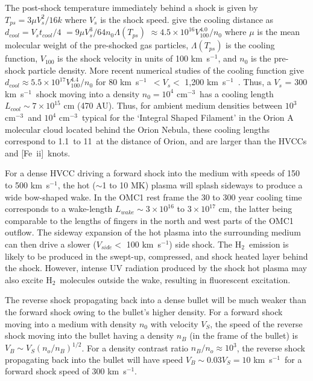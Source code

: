 \documentclass{aa}
\newcommand{\cmq}{cm{$^{-3}$}}
\newcommand{\kms}{km~s{$^{-1}$}}
\newcommand{\Feii}{[Fe~{\sc ii}]}
\newcommand{\hh}{\ensuremath{\textrm{H}_{2}}}			%
\begin{document}
The post-shock temperature immediately behind a  shock is  given by 
$T_{ps} = 3 \mu V_s^2/ 16 k$ where $V_s$  is the 
shock speed.   \citet{Blondin1990} give the cooling distance as
$d_{cool} = V_s t_{cool} / 4$ $= 9 \mu V_s^3 / 64 n_0 \Lambda (T_{ps})$
$ \approx 4.5 \times 10^{16} V_{100}^{4.0} / n_0$ 
where $\mu$ is the mean molecular weight of the pre-shocked gas particles, 
$\Lambda (T_{ps})$ is the cooling function,  $V_{100}$ is the
shock velocity in units of 100 \kms , and $n_0$ is the pre-shock particle density.   
More recent numerical studies of the cooling function give 
$d_{cool} \approx 5.5 \times 10^{17} V_{100}^{4.4} / n_0$  for $80$ \kms\
$< V_s <$ 1,200 \kms\ \citep{Draine2011}.  Thus, a $V_s$ = 300 \kms\ shock
moving into a density $n_0 = 10^4$ \cmq\ has a cooling length 
$L_{cool} \sim 7 \times 10^{15}$ cm (470 AU).  Thus, for ambient medium 
densities between $10^3$ \cmq\ and $10^4$ \cmq\  typical for the 
`Integral Shaped Filament' in the Orion A molecular cloud located behind the 
Orion Nebula, these cooling  lengths correspond to 1.1\arcsec\   to 11\arcsec\   
at the distance of Orion, and are larger than the HVCCs and \Feii\  knots.   

For a dense HVCC driving a forward shock into the medium with  speeds of 150 to 500 
\kms , the hot ($\sim$1 to 10 MK) plasma will splash sideways to produce a wide
bow-shaped wake.    In the OMC1 rest frame the 30 to 300 year cooling time corresponds 
to a wake-length  $L_{wake} \sim 3 \times 10^{16}$ to $3 \times 10^{17}$ cm, the
latter being comparable to the lengths of fingers in the north and west parts of the 
OMC1 outflow.    The sideway expansion of the hot plasma into the surrounding 
medium can then drive  a slower ($V_{side} < $ 100 \kms ) side shock.   The  \hh\ emission
is likely to be produced in the swept-up, compressed, and shock heated layer  
behind the shock.   However, intense UV radiation produced by the shock hot plasma
may also excite \hh\ molecules outside the wake, resulting in fluorescent 
excitation.

The reverse shock propagating back into a dense bullet will be much weaker than the 
forward shock owing to the bullet's higher density.  For a forward shock moving into a medium 
with density $n_0$ with velocity $V_S$, the speed of the reverse shock moving into the 
bullet having a density $n_B$ (in the frame of the bullet) is  $V_B \sim V_S (n_o/n_B)^{1/2}$.  
For a density contrast ratio  $n_B / n_o \approx 10^3$,  the reverse shock 
propagating back into the bullet will have  speed $V_B \sim 0.03 V_S = 10$ \kms\ 
for a forward shock speed of 300 \kms .
\end{document}
